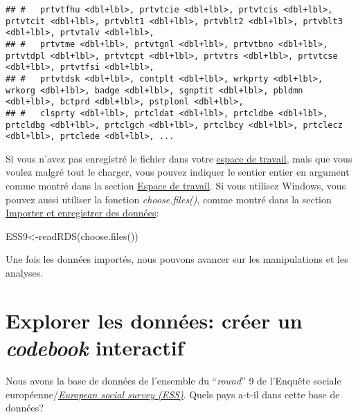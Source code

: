 \documentclass[
]{book}
\newenvironment{Shaded}{\begin{snugshade}}{\end{snugshade}}
\newcommand{\FunctionTok}[1]{\textcolor[rgb]{0.00,0.00,0.00}{#1}}
\newcommand{\NormalTok}[1]{#1}
\newcommand{\OtherTok}[1]{\textcolor[rgb]{0.56,0.35,0.01}{#1}}
\begin{document}
\begin{verbatim}
## #   prtvtfhu <dbl+lbl>, prtvtcie <dbl+lbl>, prtvtcis <dbl+lbl>, prtvtcit <dbl+lbl>, prtvblt1 <dbl+lbl>, prtvblt2 <dbl+lbl>, prtvblt3 <dbl+lbl>, prtvtalv <dbl+lbl>,
## #   prtvtme <dbl+lbl>, prtvtgnl <dbl+lbl>, prtvtbno <dbl+lbl>, prtvtdpl <dbl+lbl>, prtvtcpt <dbl+lbl>, prtvtrs <dbl+lbl>, prtvtcse <dbl+lbl>, prtvtfsi <dbl+lbl>,
## #   prtvtdsk <dbl+lbl>, contplt <dbl+lbl>, wrkprty <dbl+lbl>, wrkorg <dbl+lbl>, badge <dbl+lbl>, sgnptit <dbl+lbl>, pbldmn <dbl+lbl>, bctprd <dbl+lbl>, pstplonl <dbl+lbl>,
## #   clsprty <dbl+lbl>, prtcldat <dbl+lbl>, prtcldbe <dbl+lbl>, prtcldbg <dbl+lbl>, prtclgch <dbl+lbl>, prtclbcy <dbl+lbl>, prtclecz <dbl+lbl>, prtclede <dbl+lbl>, ...
\end{verbatim}

Si vous n'avez pas enregistré le fichier dans votre \protect\hyperlink{working_directory}{espace de travail}, mais que vous voulez malgré tout le charger, vous pouvez indiquer le sentier entier en argument comme montré dans la section \protect\hyperlink{working_directory}{Espace de travail}. Si vous utilisez Windows, vous pouvez aussi utiliser la fonction \emph{choose.files()}, comme montré dans la section \protect\hyperlink{import_donnees}{Importer et enregistrer des données}:

\begin{Shaded}
\begin{Highlighting}[]
\NormalTok{ESS9}\OtherTok{\textless{}{-}}\FunctionTok{readRDS}\NormalTok{(}\FunctionTok{choose.files}\NormalTok{())}
\end{Highlighting}
\end{Shaded}

Une fois les données importés, nous pouvons avancer sur les manipulations et les analyses.

\hypertarget{explorer-les-donnuxe9es-cruxe9er-un-codebook-interactif}{%
\section{\texorpdfstring{Explorer les données: créer un \emph{codebook} interactif}{Explorer les données: créer un codebook interactif}}\label{explorer-les-donnuxe9es-cruxe9er-un-codebook-interactif}}

Nous avons la base de données de l'ensemble du ``\emph{round}'' 9 de l'Enquête sociale européenne/\href{https://www.europeansocialsurvey.org/}{\emph{European social survey (ESS)}}. Quels pays a-t-il dans cette base de données?
\end{document}
